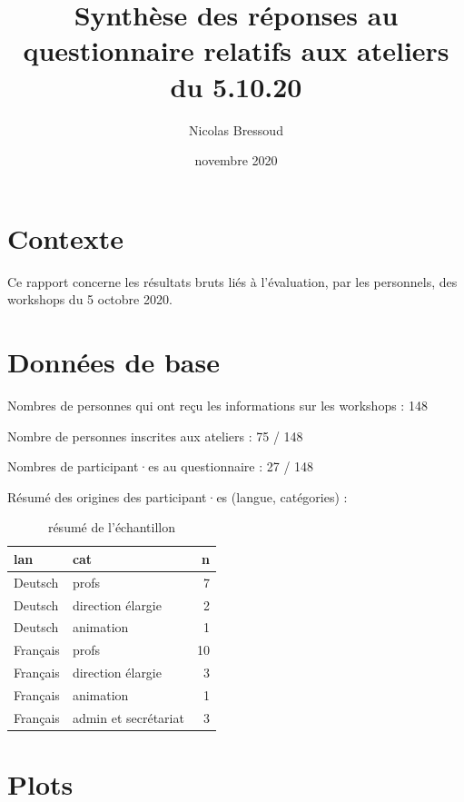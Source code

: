 \documentclass[
  french,
]{article}
\title{Synthèse des réponses au questionnaire relatifs aux ateliers du 5.10.20}
\author{Nicolas Bressoud}
\date{novembre 2020}
\begin{document}
\maketitle

\renewcommand*\contentsname{Table des matières}
{
\setcounter{tocdepth}{2}
\tableofcontents
}
\hypertarget{contexte}{%
\section{Contexte}\label{contexte}}

Ce rapport concerne les résultats bruts liés à l'évaluation, par les personnels, des workshops du 5 octobre 2020.

\hypertarget{donnuxe9es-de-base}{%
\section{Données de base}\label{donnuxe9es-de-base}}

Nombres de personnes qui ont reçu les informations sur les workshops : 148

Nombre de personnes inscrites aux ateliers : 75 / 148

Nombres de participant·es au questionnaire : 27 / 148

Résumé des origines des participant·es (langue, catégories) :

\begin{table}

\caption{\label{tab:table}résumé de l'échantillon}
\centering
\begin{tabular}[t]{l|l|r}
\hline
lan & cat & n\\
\hline
Deutsch & profs & 7\\
\hline
Deutsch & direction élargie & 2\\
\hline
Deutsch & animation & 1\\
\hline
Français & profs & 10\\
\hline
Français & direction élargie & 3\\
\hline
Français & animation & 1\\
\hline
Français & admin et secrétariat & 3\\
\hline
\end{tabular}
\end{table}

\hypertarget{plots}{%
\section{Plots}\label{plots}}
\end{document}
